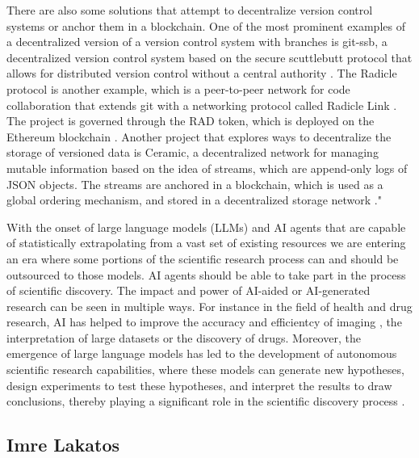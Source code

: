 \documentclass[14pt]{article}
\begin{document}
There are also some solutions that attempt to decentralize version control systems or anchor them in a blockchain. One of the most prominent examples of a decentralized version of a version control system with branches is git-ssb, a decentralized version control system based on the secure scuttlebutt protocol that allows for distributed version control without a central authority \cite{gitssb}. The Radicle protocol is another example, which is a peer-to-peer network for code collaboration that extends git with a networking protocol called Radicle Link \cite{radicle}. The project is governed through the RAD token, which is deployed on the Ethereum blockchain \cite{buterin2013ethereum}. Another project that explores ways to decentralize the storage of versioned data is Ceramic, a decentralized network for managing mutable information based on the idea of streams, which are append-only logs of JSON objects. The streams are anchored in a blockchain, which is used as a global ordering mechanism, and stored in a decentralized storage network \cite{ceramic}."

With the onset of large language models (LLMs) and AI agents that are capable of statistically extrapolating from a vast set of existing resources we are entering an era where some portions of the scientific research process can and should be outsourced to those models. AI agents should be able to take part in the process of scientific discovery. The impact and power of AI-aided or AI-generated research can be seen in multiple ways. For instance in the field of health and drug research, AI has helped to improve the accuracy and efficientcy of imaging \cite{Topol2019}, the interpretation of large datasets \cite{Libbrecht2015,Kraus2019,Holzinger2019} or the discovery of drugs\cite{AlQuraishi2019}. Moreover, the emergence of large language models has led to the development of autonomous scientific research capabilities, where these models can generate new hypotheses, design experiments to test these hypotheses, and interpret the results to draw conclusions, thereby playing a significant role in the scientific discovery process \cite{EmergentAutonomous2023}.


\subsection{Imre Lakatos}
\end{document}
